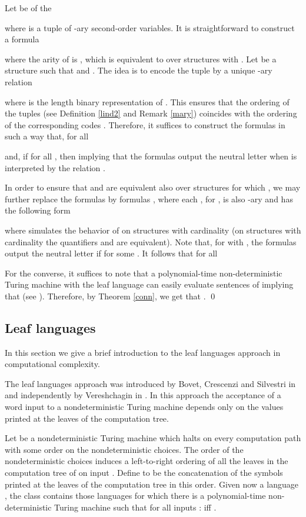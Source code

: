 \documentclass{LMCS}
\begin{document}
Let  be of the   
 
where  is a tuple of -ary second-order variables. It is straightforward to construct a formula 
 
where the arity of  is , which is equivalent to  over structures  with . Let  be a structure such that  and .  The idea is to encode the tuple  by a unique -ary relation 

where  is the length  binary representation of . This ensures that  the  ordering of the tuples  (see Definition \ref{lind2} and Remark \ref{mary}) coincides with the ordering of the corresponding codes . Therefore, it suffices to construct the formulas  in such a way that, for all    

and,  if  for all , then   implying that  the formulas  output the neutral letter when  is interpreted by the relation . 

In order to ensure that   
 and  are equivalent also over structures  for which , we may further replace the formulas 
 by formulas , where each  , for , is also -ary and  has the following form

where  simulates the behavior of  on structures with cardinality  (on structures with cardinality  the quantifiers  and  are equivalent).  Note that, for  with , the formulas
  output the neutral letter if  for some . It follows that for all 


For the converse, it suffices to note that a
polynomial-time non-deterministic Turing machine with the leaf language  can  easily evaluate sentences of  implying that   (see \cite{buvo98}). Therefore, by Theorem \ref{conn}, we get that .
\qed

\subsection{Leaf languages}\label{leafl}
In this section we give a brief introduction to the leaf languages approach in computational complexity.

 The leaf languages approach was introduced by Bovet, Crescenzi and Silvestri in \cite{bocrsi92} and independently by Vereshchagin in \cite{ver93a}. In this approach the acceptance of a word input to a nondeterministic Turing machine depends only on the values printed at the leaves of the computation tree. 

Let  be a nondeterministic Turing machine which halts on every computation path with some order on the nondeterministic choices. The order of the nondeterministic choices induces a left-to-right ordering of all the leaves in the computation tree of  on input . Define  to be the concatenation of the symbols printed at the leaves of the computation tree in this order. Given now a language  , the class  contains those languages  for which there is a polynomial-time non-deterministic Turing machine  such that for all inputs :  iff  .
\end{document}

